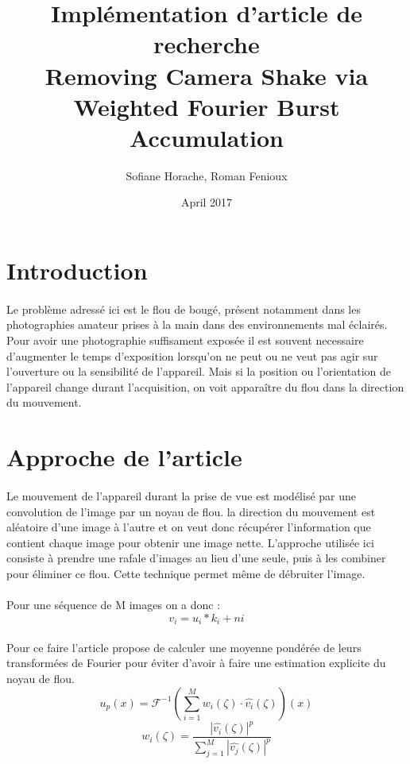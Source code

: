 \documentclass[a4paper,10pt]{report}
\title{Implémentation d'article de recherche \\ 
Removing Camera Shake via Weighted Fourier Burst Accumulation}
\author{Sofiane Horache, Roman Fenioux}
\date{April 2017}
\begin{document}
\maketitle

\setcounter{secnumdepth}{0}

\section{Introduction}
\paragraph{}
Le problème adressé ici est le flou de bougé, présent notamment dans les photographies 
amateur prises à la main dans des environnements mal éclairés. Pour avoir une photographie 
suffisament exposée il est souvent necessaire d'augmenter le temps d'exposition lorsqu'on 
ne peut ou ne veut pas agir sur l'ouverture ou la sensibilité de l'appareil. Mais si la 
position ou l'orientation de l'appareil change durant l'acquisition, on voit apparaître du flou dans la direction
du mouvement. 

\section{Approche de l'article}
\paragraph{}
Le mouvement de l'appareil durant la prise de vue est modélisé par une convolution de l'image
par un noyau de flou. la direction du mouvement est aléatoire d'une image à l'autre et on veut donc 
récupérer l'information que contient chaque image pour obtenir une image nette. L'approche utilisée 
ici consiste à prendre une rafale d'images au lieu d'une seule, puis à les combiner pour éliminer ce 
flou. Cette technique permet même de débruiter l'image. 
\paragraph{}
Pour une séquence de M images on a donc :
\[
  v_{i} = u_{i} \ast k_{i} + n{i}
\]
\paragraph{}
Pour ce faire l'article propose de calculer une moyenne pondérée de leurs transformées 
de Fourier pour éviter d'avoir à faire une estimation explicite du noyau de flou.
\[
  u_{p}(x) = \mathcal{F}^{-1}\left(\sum_{i=1}^M w_{i}(\zeta)\cdot \hat{v_{i}}(\zeta)\right)(x)
\]
\[
  w_{i}(\zeta) = \frac{|\hat{v_{i}}(\zeta)|^p}{\sum_{j=1}^M |\hat{v_{j}}(\zeta)|^p}
\]
\end{document}
